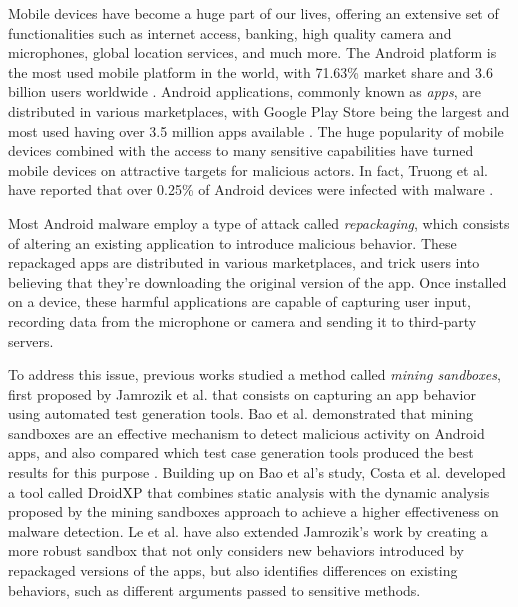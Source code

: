 Mobile devices have become a huge part of our lives, offering an extensive set of functionalities such as internet access, banking, high quality camera and microphones, global location services, and much more. The Android platform is the most used mobile platform in the world, with 71.63\% market share and 3.6 billion users worldwide \cite{turner_how_nodate}. Android applications, commonly known as \textit{apps}, are distributed in various marketplaces, with Google Play Store being the largest and most used having over 3.5 million apps available \cite{turner_how_nodate-1}. The huge popularity of mobile devices combined with the access to many sensitive capabilities have turned mobile devices on attractive targets for malicious actors. In fact, Truong et al. have reported that over 0.25\% of Android devices were infected with malware \cite{truong_company_2014}.

Most Android malware employ a type of attack called \textit{repackaging}, which consists of altering an existing application to introduce malicious behavior. These repackaged apps are distributed in various marketplaces, and trick users into believing that they're downloading the original version of the app. Once installed on a device, these harmful applications are capable of capturing user input, recording data from the microphone or camera and sending it to third-party servers.

To address this issue, previous works studied a method called \textit{mining sandboxes}, first proposed by Jamrozik et al. \cite{jamrozik_mining_2016} that consists on capturing an app behavior using automated test generation tools. Bao et al.  demonstrated that mining sandboxes are an effective mechanism to detect malicious activity on Android apps, and also compared which test case generation tools produced the best results for this purpose \cite{bao_mining_2018}. Building up on Bao et al's study, Costa et al. \cite{costa_exploring_2022} developed a tool called DroidXP that combines static analysis with the dynamic analysis proposed by the mining sandboxes approach to achieve a higher effectiveness on malware detection. Le et al. \cite{le_towards_2018} have also extended Jamrozik's work by creating a more robust sandbox that not only considers new behaviors introduced by repackaged versions of the apps, but also identifies differences on existing behaviors, such as different arguments passed to sensitive methods.

